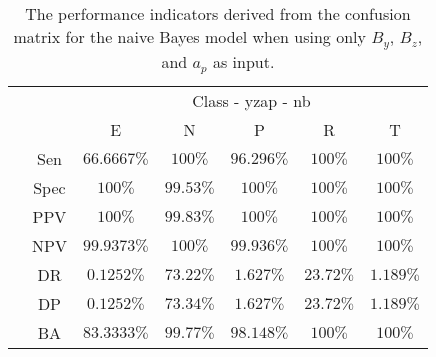 \begin{table}[!ht]
	\centering
	\begin{tabular}{|c|c|c|c|c|c|c|}
		\cline{3-7}
		\multicolumn{2}{c|}{} & \multicolumn{5}{c|}{Class - yzap - nb} \\ \cline{3-7}
		\multicolumn{2}{c|}{} & E & N & P & R & T \\ \hline
		\multirow{7}{*}{\rotatebox{90}{Statistics}} & Sen & $66.6667\%$ & $100\%$ & $96.296\%$ & $100\%$ & $100\%$ \\ \cline{2-7}
		 & Spec & $100\%$ & $99.53\%$ & $100\%$ & $100\%$ & $100\%$ \\ \cline{2-7}
		 & PPV & $100\%$ & $99.83\%$ & $100\%$ & $100\%$ & $100\%$ \\ \cline{2-7}
		 & NPV & $99.9373\%$ & $100\%$ & $99.936\%$ & $100\%$ & $100\%$ \\ \cline{2-7}
		 & DR & $0.1252\%$ & $73.22\%$ & $1.627\%$ & $23.72\%$ & $1.189\%$ \\ \cline{2-7}
		 & DP & $0.1252\%$ & $73.34\%$ & $1.627\%$ & $23.72\%$ & $1.189\%$ \\ \cline{2-7}
		 & BA & $83.3333\%$ & $99.77\%$ & $98.148\%$ & $100\%$ & $100\%$ \\ \hline
	\end{tabular}
	\caption{The performance indicators derived from the confusion matrix for the naive Bayes model when using only $B_{y}$, $B_{z}$, and $a_{p}$ as input.}
	\label{tab:cs:reverse:yzap:nb}
\end{table}
